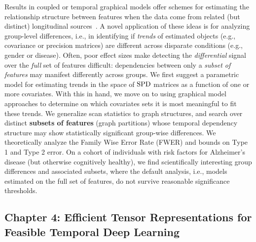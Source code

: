 Results in coupled or temporal graphical models offer schemes for estimating the relationship structure 
between features when the data come from
related (but distinct) longitudinal sources~\citep{zhou2010time,caffo}. A novel application of these ideas is for analyzing group-level differences, i.e., in identifying if {\em trends} of estimated objects (e.g., 
covariance or precision matrices) are different across disparate conditions (e.g., gender or disease).
Often, poor effect sizes make detecting the \textit{differential} signal 
over the {\em full} set of features difficult: 
dependencies between only a {\em subset of features} may manifest differently across groups.
We first suggest
a parametric model 
for estimating trends in the space of $\operatorname*{SPD}$ matrices as a function of one or more covariates.
With this in hand,
we move on to using 
graphical model approaches to determine
on which covariates sets it is most meaningful to 
fit these trends.
We generalize scan statistics to graph structures, 
and search over distinct \textbf{subsets of features} (graph partitions) whose temporal dependency structure may show statistically 
significant group-wise differences.
We theoretically analyze the Family Wise Error Rate (FWER) and bounds on Type 1 and Type 2 error. 
On a cohort of individuals with risk factors for Alzheimer's disease (but otherwise cognitively healthy), 
we 
find scientifically interesting 
group differences and associated subsets, where the default analysis, 
i.e., models estimated on the full set of features, do not survive reasonable 
significance thresholds. 


\subsection{Chapter 4: Efficient Tensor Representations for Feasible Temporal Deep Learning}

